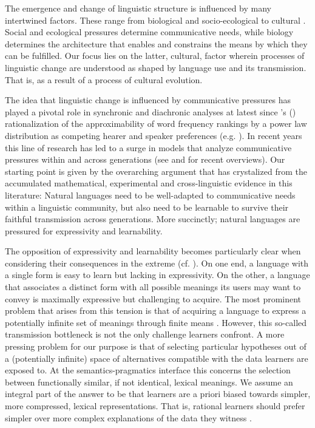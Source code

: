 \documentclass[a4paper]{article}
\newcommand{\citeposs}[2][]{\citeauthor{#2}'s (\citeyear[#1]{#2})}
\begin{document}
The emergence and change of linguistic structure is influenced by many intertwined factors. These range from biological and socio-ecological to cultural \citep{steels:2011,tamariz+kirby:2016}. Social and ecological pressures determine communicative needs, while biology determines the architecture that enables and constrains the means by which they can be fulfilled. Our focus lies on the latter, cultural, factor wherein processes of linguistic change are understood as shaped by language use and its transmission. That is, as a result of a process of cultural evolution. 

The idea that linguistic change is influenced by communicative pressures has played a pivotal role in synchronic and diachronic analyses at latest since \citeposs{zipf:1949} rationalization of the approximability of word frequency rankings by a power law distribution as competing hearer and speaker preferences (e.g. \citealt{martinet:1962, horn:1984,jaeger+vRooij:2007,jaeger:2007, piantadosi:2014,kirby+etal:2015}). In recent years this line of research has led to a surge in models that analyze communicative pressures within and across generations (see \citealt{steels:2015} and \citealt{tamariz+kirby:2016} for recent overviews). Our starting point is given by the overarching argument that has crystalized from the accumulated mathematical, experimental and cross-linguistic evidence in this literature: Natural languages need to be well-adapted to communicative needs within a linguistic community, but also need to be learnable to survive their faithful transmission across generations. More succinctly; natural languages are pressured for expressivity and learnability.   

The opposition of expressivity and learnability becomes particularly clear when considering their consequences in the extreme (cf. \citealt{kemp+regier:2012,kirby+etal:2015}). On one end, a language with a single form is easy to learn but lacking in expressivity. On the other, a language that associates a distinct form with all possible meanings its users may want to convey is maximally expressive but challenging to acquire. The most prominent problem that arises from this tension is that of acquiring a language to express a potentially infinite set of meanings through finite means \citep{kirby:2002}. However, this so-called transmission bottleneck is not the only challenge learners confront. A more pressing problem for our purpose is that of selecting particular hypotheses out of a (potentially infinite) space of alternatives compatible with the data learners are exposed to. At the semantics-pragmatics interface this concerns the selection between functionally similar, if not identical, lexical meanings. We assume an integral part of the answer to be that learners are a priori biased towards simpler, more compressed, lexical representations. That is, rational learners should prefer simpler over more complex explanations of the data they witness \citep{feldman:2000, chater+vitanyi:2003, piantadosi+etal:2012a, kirby+etal:2015,piantadosi+etal:underreview}.
\end{document}
